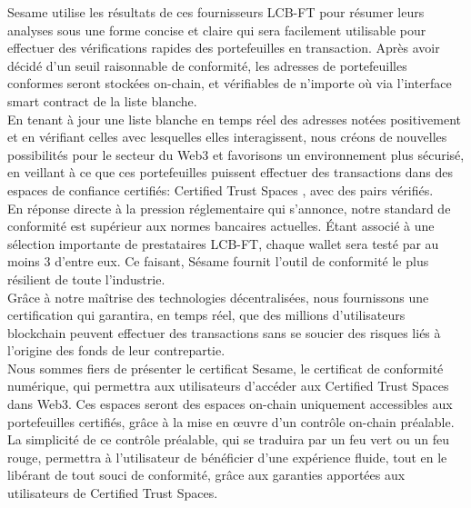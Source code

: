 ﻿\documentclass[a4paper]{article}
\let\OldTexttrademark\texttrademark
\renewcommand{\texttrademark}{\OldTexttrademark\xspace}%
\begin{document}
Sesame utilise les résultats de ces fournisseurs LCB-FT pour résumer leurs analyses sous une forme concise et claire qui sera facilement utilisable pour effectuer des vérifications rapides des portefeuilles en transaction. Après avoir décidé d'un seuil raisonnable de conformité, les adresses de portefeuilles conformes seront stockées on-chain, et vérifiables de n'importe où via l'interface smart contract de la liste blanche. \\

En tenant à jour une liste blanche en temps réel des adresses notées positivement et en vérifiant celles avec lesquelles elles interagissent, nous créons de nouvelles possibilités pour le secteur du Web3 et favorisons un environnement plus sécurisé, en veillant à ce que ces portefeuilles puissent effectuer des transactions dans des espaces de confiance certifiés: Certified Trust Spaces \OldTexttrademark, avec des pairs vérifiés. \\

En réponse directe à la pression réglementaire qui s'annonce, notre standard de conformité est supérieur aux normes bancaires actuelles. Étant associé à une sélection importante de prestataires LCB-FT, chaque wallet sera testé par au moins 3 d'entre eux. Ce faisant, Sésame fournit l'outil de conformité le plus résilient de toute l'industrie. \\

Grâce à notre maîtrise des technologies décentralisées, nous fournissons une certification qui garantira, en temps réel, que des millions d’utilisateurs blockchain peuvent effectuer des transactions sans se soucier des risques liés à l'origine des fonds de leur contrepartie. \\

Nous sommes fiers de présenter le certificat Sesame, le certificat de conformité numérique, qui permettra aux utilisateurs d'accéder aux Certified Trust Spaces \texttrademark dans Web3. Ces espaces seront des espaces on-chain uniquement accessibles aux portefeuilles certifiés, grâce à la mise en œuvre d'un contrôle on-chain préalable. La simplicité de ce contrôle préalable, qui se traduira par un feu vert ou un feu rouge, permettra à l'utilisateur de bénéficier d'une expérience fluide, tout en le libérant de tout souci de conformité, grâce aux garanties apportées aux utilisateurs de Certified Trust Spaces.
\end{document}
